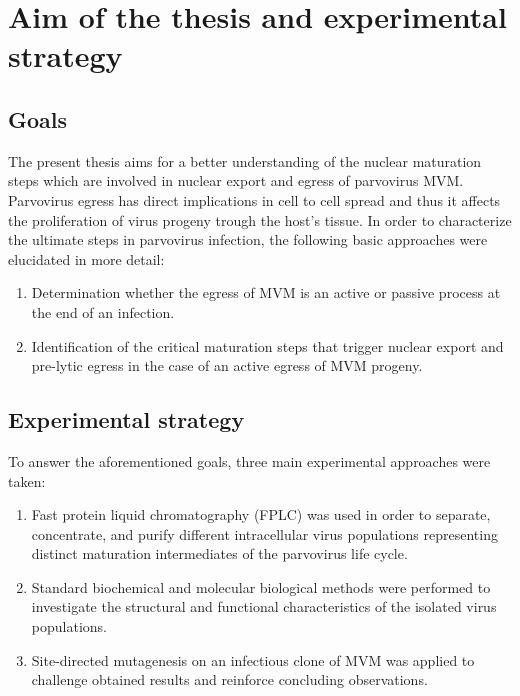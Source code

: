 
\chapter{Aim of the thesis and experimental strategy} %

\label{Aim} %


\graphicspath{{./Pictures/}}


\section{Goals}
The present thesis aims for a better understanding of the nuclear maturation steps which are involved in nuclear export and egress of parvovirus MVM. Parvovirus egress has direct implications in cell to cell spread and thus it affects the proliferation of virus progeny trough the host's tissue. In order to characterize the ultimate steps in parvovirus infection, the following basic approaches were elucidated in more detail:         

\medskip

\begin{enumerate}
\item Determination whether the egress of MVM is an active or passive process at the end of an infection. 
\item Identification of the critical maturation steps that trigger nuclear export and pre-lytic egress in the case of an active egress of MVM progeny.  
\end{enumerate}

\bigskip
\bigskip

\section{Experimental strategy}

To answer the aforementioned goals, three main experimental approaches were taken:

\medskip

\begin{enumerate}
\item Fast protein liquid chromatography (FPLC) was used in order to separate, concentrate, and purify different intracellular virus populations representing distinct maturation intermediates of the parvovirus life cycle. 
\item Standard biochemical and molecular biological methods were performed to investigate the structural and functional characteristics of the isolated virus populations.   
\item Site-directed mutagenesis on an infectious clone of MVM was applied to challenge obtained results and reinforce concluding observations.
\end{enumerate}

